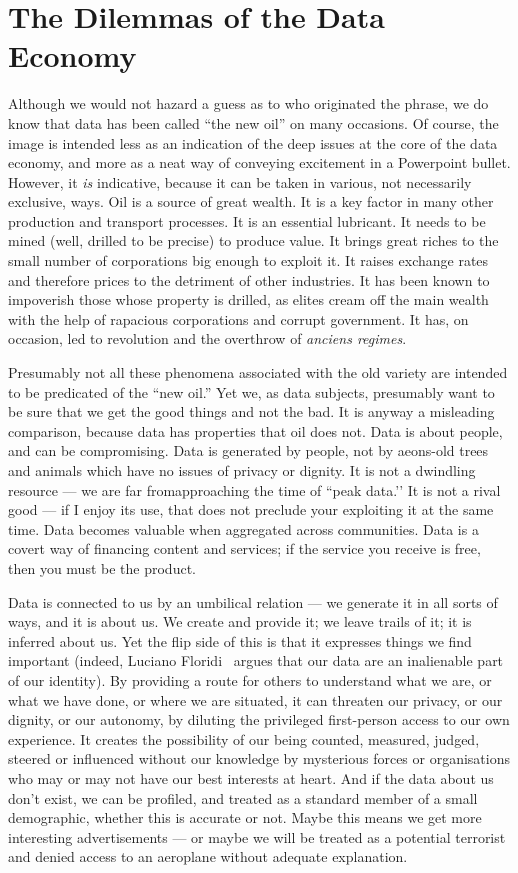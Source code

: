 \documentclass[graybox]{svmult}
\begin{document}
\section{The Dilemmas of the Data Economy}

Although we would not hazard a guess as to who originated the phrase, we do know that data has been called ``the new oil'' on many occasions. Of course, the image is intended less as an indication of the deep issues at the core of the data economy, and more as a neat way of conveying excitement in a Powerpoint bullet. However, it {\em is} indicative, because it can be taken in various, not necessarily exclusive, ways. Oil is a source of great wealth. It is a key factor in many other production and transport processes. It is an essential lubricant. It needs to be mined (well, drilled to be precise) to produce value. It brings great riches to the small number of corporations big enough to exploit it. It raises exchange rates and therefore prices to the detriment of other industries. It has been known to impoverish those whose property is drilled, as elites cream off the main wealth with the help of rapacious corporations and corrupt government. It has, on occasion, led to revolution and the overthrow of {\em anciens regimes}.

Presumably not all these phenomena associated with the old variety are intended to be predicated of the ``new oil.'' Yet we, as data subjects, presumably want to be sure that we get the good things and not the bad. It is anyway a misleading comparison, because data has properties that oil does not. Data is about people, and can be compromising. Data is generated by people, not by aeons-old trees and animals which have no issues of privacy or dignity. It is not a dwindling resource --- we are far fromapproaching the time of ``peak data.’’ It is not a rival good --- if I enjoy its use, that does not preclude your exploiting it at the same time. Data becomes valuable when aggregated across communities. Data is a covert way of financing content and services; if the service you receive is free, then you must be the product.

Data is connected to us by an umbilical relation --- we generate it in all sorts of ways, and it is about us. We create and provide it; we leave trails of it; it is inferred about us. Yet the flip side of this is that it expresses things we find important (indeed, Luciano Floridi~\cite{floridi2013} argues that our data are an inalienable part of our identity). By providing a route for others to understand what we are, or what we have done, or where we are situated, it can threaten our privacy, or our dignity, or our autonomy, by diluting the privileged first-person access to our own experience. It creates the possibility of our being counted, measured, judged, steered or influenced without our knowledge by mysterious forces or organisations who may or may not have our best interests at heart. And if the data about us don't exist, we can be profiled, and treated as a standard member of a small demographic, whether this is accurate or not. Maybe this means we get more interesting advertisements --- or maybe we will be treated as a potential terrorist and denied access to an aeroplane without adequate explanation.
\end{document}

